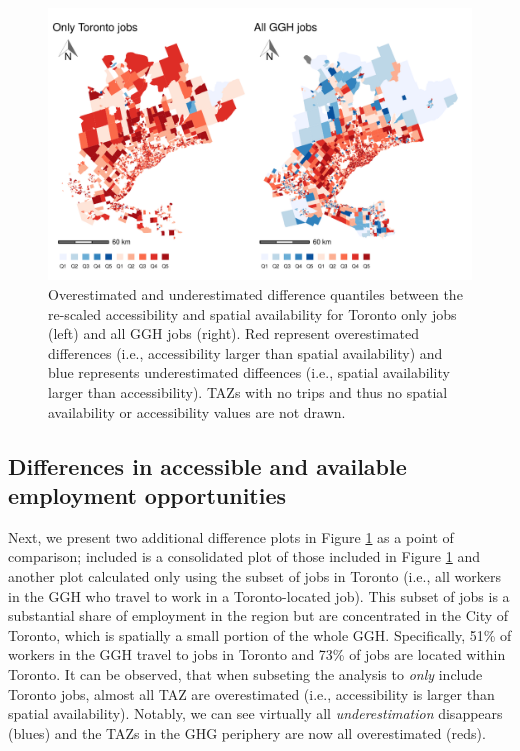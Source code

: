 \documentclass[]{elsarticle} %
\begin{document}
\newpage

\begin{figure}
\includegraphics[width=1\linewidth]{Spatial-Availability_files/figure-latex/plot-diff-Toronto-vs-GGH-1} \caption{\label{fig:plot-diff-Toronto-vs-GGH}Overestimated and underestimated difference quantiles between the re-scaled accessibility and spatial availability for Toronto only jobs (left) and all GGH jobs (right). Red represent overestimated differences (i.e., accessibility larger than spatial availability) and blue represents underestimated diffeences (i.e., spatial availability larger than accessibility). TAZs with no trips and thus no spatial availability or accessibility values are not drawn.}\label{fig:plot-diff-Toronto-vs-GGH}
\end{figure}

\hypertarget{differences-in-accessible-and-available-employment-opportunities}{%
\subsection{Differences in accessible and available employment
opportunities}\label{differences-in-accessible-and-available-employment-opportunities}}

Next, we present two additional difference plots in Figure
\ref{fig:plot-diff-Toronto-vs-GGH} as a point of comparison; included is
a consolidated plot of those included in Figure
\ref{fig:plot-diff-Toronto-vs-GGH} and another plot calculated only
using the subset of jobs in Toronto (i.e., all workers in the GGH who
travel to work in a Toronto-located job). This subset of jobs is a
substantial share of employment in the region but are concentrated in
the City of Toronto, which is spatially a small portion of the whole
GGH. Specifically, 51\% of workers in the GGH travel to jobs in Toronto
and 73\% of jobs are located within Toronto. It can be observed, that
when subseting the analysis to \emph{only} include Toronto jobs, almost
all TAZ are overestimated (i.e., accessibility is larger than spatial
availability). Notably, we can see virtually all \emph{underestimation}
disappears (blues) and the TAZs in the GHG periphery are now all
overestimated (reds).
\end{document}
